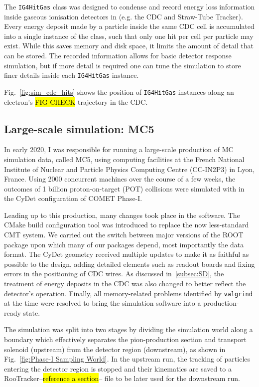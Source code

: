 The \texttt{IG4HitGas} class was designed to condense and record energy loss information inside gaseous ionisation detectors in \SimG (e.g. the CDC and Straw-Tube Tracker). Every energy deposit made by a particle inside the same CDC cell is accumulated into a single instance of the class, such that only one hit per cell per particle may exist. While this saves memory and disk space, it limits the amount of detail that can be stored. The recorded information allows for basic detector response simulation, but if more detail is required one can tune the \SimG simulation to store finer details inside each \texttt{IG4HitGas} instance.

Fig.~\ref{fig:sim_cdc_hits} shows the position of \texttt{IG4HitGas} instances along an electron's \hl{FIG CHECK} trajectory in the CDC.


\subsection{Large-scale simulation: MC5}\label{sec:mc5}
In early 2020, I was responsible for running a large-scale production of MC simulation data, called MC5, using computing facilities at the French National Institute of Nuclear and Particle Physics Computing Centre (CC-IN2P3) in Lyon, France.
Using \num{2000} concurrent machines over the course of a few weeks, the outcomes of 1 billion proton-on-target (POT) collisions were simulated with \SimG in the CyDet configuration of COMET Phase-I.

Leading up to this production, many changes took place in the software. The CMake build configuration tool was introduced to replace the now less-standard CMT system. We carried out the switch between major versions of the ROOT package upon which many of our packages depend, most importantly the \oaEvent data format. The CyDet geometry received multiple updates to make it as faithful as possible to the design, adding detailed elements such as readout boards and fixing errors in the positioning of CDC wires. As discussed in~\ref{subsec:SD}, the treatment of energy deposits in the CDC was also changed to better reflect the detector's operation.  %
Finally, all memory-related problems identified by \texttt{valgrind} at the time were resolved to bring the simulation software into a production-ready state.

The simulation was split into two stages by dividing the simulation world along a boundary which effectively separates the pion-production section and transport solenoid (upstream) from the detector region (downstream), as shown in Fig.~\ref{fig:Phase-I Sampling World}. In the upstream run, the tracking of particles entering the detector region is stopped and their kinematics are saved to a RooTracker--\hl{reference a section}-- file to be later used for the downstream run. 

